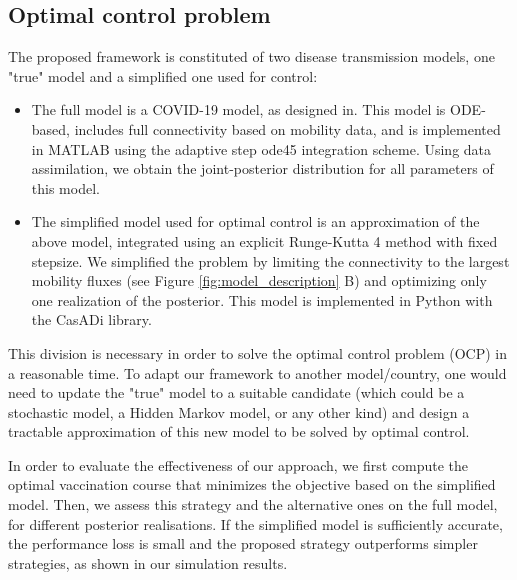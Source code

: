 

\subsection*{Optimal control problem}
The proposed framework is constituted of two disease transmission models, one "true" model and a simplified one used for control:
\begin{itemize}
    \item The full model is a COVID-19 model, as designed in\cite{Gatto:SpreadDynamicsCOVID19:2020, Bertuzzo:GeographyCOVID19Spread:2020}. This model is ODE-based, includes full connectivity based on mobility data, and is implemented in MATLAB using the adaptive step ode45 integration scheme. Using data assimilation, we obtain the joint-posterior distribution for all parameters of this model. 
    \item The simplified model used for optimal control is an approximation of the above model, integrated using an explicit Runge-Kutta 4 method with fixed stepsize. We simplified the problem by limiting the connectivity to the largest mobility fluxes (see Figure \ref{fig:model_description} B) and optimizing only one realization of the posterior. This model is implemented in Python with the CasADi library.
\end{itemize}
This division is necessary in order to solve the optimal control problem (OCP) in a reasonable time. To adapt our framework to another model/country, one would need to update the "true" model to a suitable candidate (which could be a stochastic model, a Hidden Markov model, or any other kind) and design a tractable approximation of this new model to be solved by optimal control.

In order to evaluate the effectiveness of our approach, we first compute the optimal vaccination course that minimizes the objective based on the simplified model. Then, we assess this strategy and the alternative ones on the full model, for different posterior realisations. If the simplified model is sufficiently accurate, the performance loss is small and the proposed strategy outperforms simpler strategies, as shown in our simulation results.

